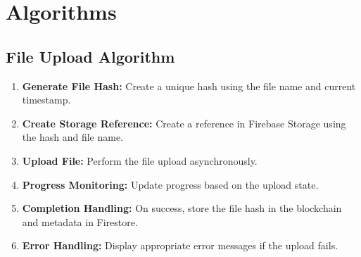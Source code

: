 \documentclass[12pt,a4paper]{report}
\begin{document}
\section{Algorithms}
\subsection{File Upload Algorithm}





   
\begin{enumerate}
   \item \textbf{Generate File Hash:} Create a unique hash using the file name and current timestamp.
   \item \textbf{Create Storage Reference:} Create a reference in Firebase Storage using the hash and file name.
   \item \textbf{Upload File:} Perform the file upload asynchronously.
   \item \textbf{Progress Monitoring:} Update progress based on the upload state.
   \item \textbf{Completion Handling:} On success, store the file hash in the blockchain and metadata in Firestore.
   \item \textbf{Error Handling:} Display appropriate error messages if the upload fails.
\end{enumerate}
\end{document}
